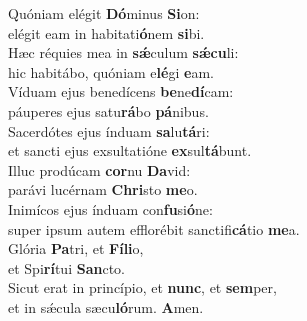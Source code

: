 \evenverse Quóniam elégit \textbf{Dó}minus \textbf{Si}on:~\*\\
\evenverse elégit eam in habitati\textbf{ó}nem \textbf{si}bi.\\
\oddverse Hæc réquies mea in \textbf{sǽ}culum \textbf{sǽ}\textbf{cu}li:~\*\\
\oddverse hic habitábo, quóniam e\textbf{lé}gi \textbf{e}am.\\
\evenverse Víduam ejus benedícens \textbf{be}ne\textbf{dí}cam:~\*\\
\evenverse páuperes ejus satu\textbf{rá}bo \textbf{pá}nibus.\\
\oddverse Sacerdótes ejus índuam \textbf{sa}lu\textbf{tá}ri:~\*\\
\oddverse et sancti ejus exsultatióne \textbf{ex}sul\textbf{tá}bunt.\\
\evenverse Illuc prodúcam \textbf{cor}nu \textbf{Da}vid:~\*\\
\evenverse parávi lucérnam \textbf{Chri}sto \textbf{me}o.\\
\oddverse Inimícos ejus índuam con\textbf{fu}si\textbf{ó}ne:~\*\\
\oddverse super ipsum autem efflorébit sanctifi\textbf{cá}tio \textbf{me}a.\\
\evenverse Glória \textbf{Pa}tri, et \textbf{Fí}\textbf{li}o,~\*\\
\evenverse et Spi\textbf{rí}tui \textbf{San}cto.\\
\oddverse Sicut erat in princípio, et \textbf{nunc}, et \textbf{sem}per,~\*\\
\oddverse et in sǽcula sæcu\textbf{ló}rum. \textbf{A}men.\\
